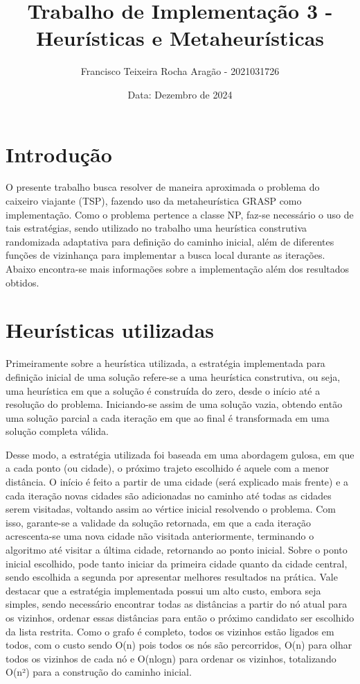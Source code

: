 \documentclass[10pt]{extarticle} %
\title{Trabalho de Implementação 3 - Heurísticas e Metaheurísticas}
\author{Francisco Teixeira Rocha Aragão - 2021031726}
\date{Data: Dezembro de 2024}
\begin{document}
\maketitle

\section{Introdução}

O presente trabalho busca resolver de maneira aproximada o problema do caixeiro viajante (TSP), fazendo uso da metaheurística GRASP como implementação. Como o problema pertence a classe NP, faz-se necessário o uso de tais estratégias, sendo utilizado no trabalho uma heurística construtiva randomizada adaptativa para definição do caminho inicial, além de diferentes funções de vizinhança para implementar a busca local durante as iterações. Abaixo encontra-se mais informações sobre a implementação além dos resultados obtidos.

\section{Heurísticas utilizadas}

Primeiramente sobre a heurística utilizada, a estratégia implementada para definição inicial de uma solução refere-se a uma heurística construtiva, ou seja, uma heurística em que a solução é construída do zero, desde o início até a resolução do problema. Iniciando-se assim de uma solução vazia, obtendo então uma solução parcial a cada iteração em que ao final é transformada em uma solução completa válida.

Desse modo, a estratégia utilizada foi baseada em uma abordagem gulosa, em que a cada ponto (ou cidade), o próximo trajeto escolhido é aquele com a menor distância. O início é feito a partir de uma cidade (será explicado mais frente) e a cada iteração novas cidades são adicionadas no caminho até todas as cidades serem visitadas, voltando assim ao vértice inicial resolvendo o problema. Com isso, garante-se a validade da solução retornada, em que a cada iteração acrescenta-se uma nova cidade não visitada anteriormente, terminando o algoritmo até visitar a última cidade, retornando ao ponto inicial. Sobre o ponto inicial escolhido, pode tanto iniciar da primeira cidade quanto da cidade central, sendo escolhida a segunda por apresentar melhores resultados na prática. Vale destacar que a estratégia implementada possui um alto custo, embora seja simples, sendo necessário encontrar todas as distâncias a partir do nó atual para os vizinhos, ordenar essas distâncias para então o próximo candidato ser escolhido da lista restrita. Como o grafo é completo, todos os vizinhos estão ligados em todos, com o custo sendo O(n) pois todos os nós são percorridos, O(n) para olhar todos os vizinhos de cada nó e O(nlogn) para ordenar os vizinhos, totalizando O(n²) para a construção do caminho inicial.
\end{document}
